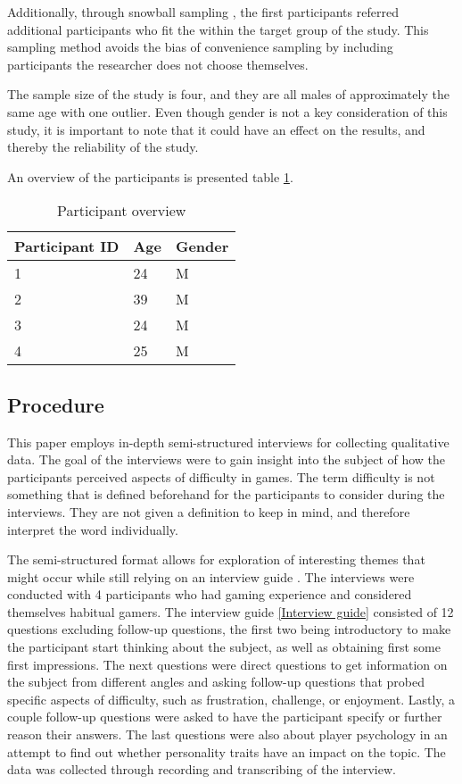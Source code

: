 Additionally, through snowball sampling \cite{thomas_bjorner_qualitative_2015}, the first participants referred additional participants who fit the within the target group of the study. This sampling method avoids the bias of convenience sampling by including participants the researcher does not choose themselves. 

The sample size of the study is four, and they are all males of approximately the same age with one outlier. Even though gender is not a key consideration of this study, it is important to note that it could have an effect on the results, and thereby the reliability of the study. 

An overview of the participants is presented table \ref{Participant overview}.

\begin{table}[ht]
\centering
\begin{tabular}{|l|l|l|} \hline %
\textbf{Participant ID}& \textbf{Age} &\textbf{Gender}\\
\hline
1& 24 &M\\ \hline
2& 39 &M\\ \hline
 3&24 &M\\ \hline
 4&25 &M\\\hline
\end{tabular}
\caption{Participant overview}\label{Participant overview}
\end{table}


\subsection{Procedure}
This paper employs in-depth semi-structured interviews for collecting qualitative data. The goal of the interviews were to gain insight into the subject of how the participants perceived aspects of difficulty in games. The term difficulty is not something that is defined beforehand for the participants to consider during the interviews. They are not given a definition to keep in mind, and therefore interpret the word individually. 

The semi-structured format allows for exploration of interesting themes that might occur while still relying on an interview guide \cite{thomas_bjorner_qualitative_2015}.  The interviews were conducted with 4 participants who had gaming experience and considered themselves habitual gamers. The interview guide \ref{Interview guide} consisted of 12 questions excluding follow-up questions, the first two being introductory to make the participant start thinking about the subject, as well as obtaining first some first impressions. The next questions were direct questions to get information on the subject from different angles and asking follow-up questions that probed specific aspects of difficulty, such as frustration, challenge, or enjoyment.
Lastly, a couple follow-up questions were asked to have the participant specify or further reason their answers. The last questions were also about player psychology in an attempt to find out whether personality traits have an impact on the topic. The data was collected through recording and transcribing of the interview.

